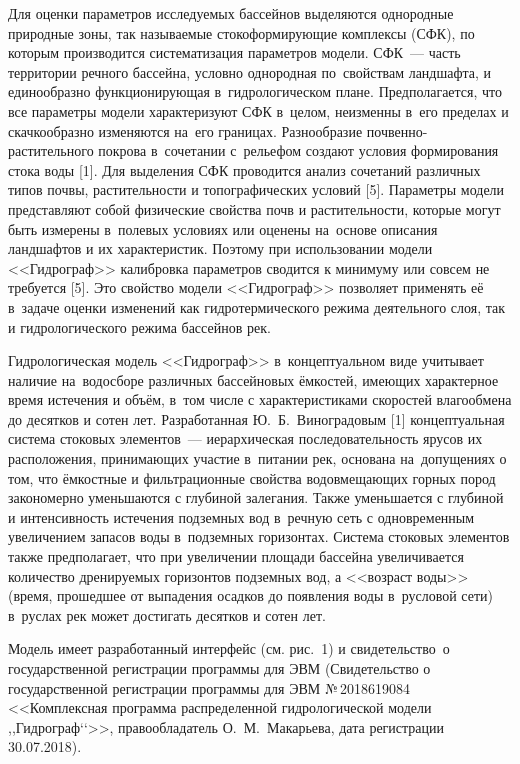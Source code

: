 Для оценки параметров исследуемых бассейнов выделяются однородные природные зоны, так называемые стокоформирующие комплексы (СФК), по которым производится систематизация параметров модели. СФК~--- часть территории речного бассейна, условно однородная по~свойствам ландшафта, и единообразно функционирующая в~гидрологическом плане. Предполагается, что все параметры модели характеризуют СФК в~целом, неизменны в~его пределах и скачкообразно изменяются на~его границах. Разнообразие почвенно-растительного покрова в~сочетании с~рельефом создают условия формирования стока воды [1]. Для выделения СФК проводится анализ сочетаний различных типов почвы, растительности и топографических условий [5]. Параметры модели представляют собой физические свойства почв и растительности, которые могут быть измерены в~полевых условиях или оценены на~основе описания ландшафтов и их характеристик. Поэтому при использовании модели <<Гидрограф>> калибровка параметров сводится к минимуму или совсем не требуется [5]. Это свойство модели <<Гидрограф>> позволяет применять её в~задаче оценки изменений как гидротермического режима деятельного слоя, так и гидрологического режима бассейнов рек.




Гидрологическая модель <<Гидрограф>> в~концептуальном виде учитывает наличие на~водосборе различных бассейновых ёмкостей, имеющих характерное время истечения и объём, в~том числе с характеристиками скоростей влагообмена до десятков и сотен лет. Разработанная Ю.~Б.~Виноградовым [1] концептуальная система стоковых элементов~--- иерархическая последовательность ярусов их расположения, принимающих участие в~питании рек, основана на~допущениях о том, что ёмкостные и фильтрационные свойства водовмещающих горных пород закономерно уменьшаются с глубиной залегания. Также уменьшается с глубиной и интенсивность истечения подземных вод в~речную сеть с одновременным увеличением запасов воды в~подземных горизонтах. Система стоковых элементов также предполагает, что при увеличении площади бассейна увеличивается количество дренируемых горизонтов подземных вод, а <<возраст воды>> (время, прошедшее от выпадения осадков до появления воды в~русловой сети) в~руслах рек может достигать десятков и сотен лет.

Модель имеет разработанный интерфейс (см. рис.~1) и свидетельство о государственной регистрации программы для ЭВМ (Свидетельство о государственной регистрации программы для ЭВМ №\,2018619084 <<Комплексная программа распределенной гидрологической модели ,,Гидрограф‘‘>>, правообладатель О.~М.~Макарьева, дата регистрации 30.07.2018).

